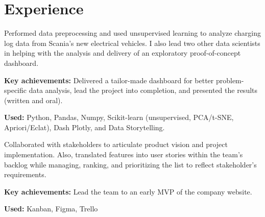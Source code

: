 \documentclass[a4paper]{plushcv}
\begin{document}
\vspace{1.0em}
\begin{minipage}[t]{0.69\textwidth} 




\section{Experience}
\vspace{\topsep}
\begin{tightemize}
\sectionsep

	\item Performed data preprocessing and used unsupervised learning to analyze charging log data from Scania's new electrical vehicles. I also lead two other data scientists in helping with the analysis and delivery of an exploratory proof-of-concept dashboard.
	
	\item \textbf{Key achievements:} Delivered a tailor-made dashboard for better problem-specific data analysis, lead the project into completion, and presented the results (written and oral).
	
	\item \textbf{Used:} Python, Pandas, Numpy, Scikit-learn (unsupervised, PCA/t-SNE, Apriori/Eclat), Dash Plotly, and Data Storytelling.
	
\end{tightemize}
\sectionsep
\sectionsep
{}
\begin{tightemize}
\sectionsep


	\item Collaborated with stakeholders to articulate product vision and project implementation. Also, translated features into user stories within the team’s backlog while managing, ranking, and prioritizing the list to reflect stakeholder’s requirements.
	
	\item \textbf{Key achievements:} Lead the team to an early MVP of the company website.
	
	\item \textbf{Used:} Kanban, Figma, Trello
	
\end{tightemize}
\sectionsep
\sectionsep
{}
\begin{tightemize}
\sectionsep


\end{tightemize}
\end{minipage}
\end{document}
